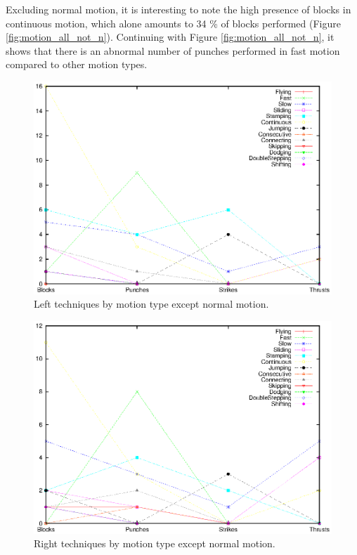 \documentclass[10pt,twocolumn,a4paper]{article}
\begin{document}
  Excluding normal motion, it is interesting to note the high presence of
  blocks in continuous motion, which alone amounts to 34 \% of blocks
  performed (Figure \ref{fig:motion_all_not_n}). Continuing with Figure
  \ref{fig:motion_all_not_n}, it shows that there is an abnormal number of
  punches performed in fast motion compared to other motion types.

  \begin{figure}
    \includegraphics[scale=0.72]{data/gnuplot/eps/motion_left_not_n}
    \caption{Left techniques by motion type except normal motion.}
    \label{fig:motion_left_not_n}
  \end{figure}

  \begin{figure}
    \includegraphics[scale=0.72]{data/gnuplot/eps/motion_right_not_n}
    \caption{Right techniques by motion type except normal motion.}
    \label{fig:motion_right_not_n}
  \end{figure}
\end{document}
